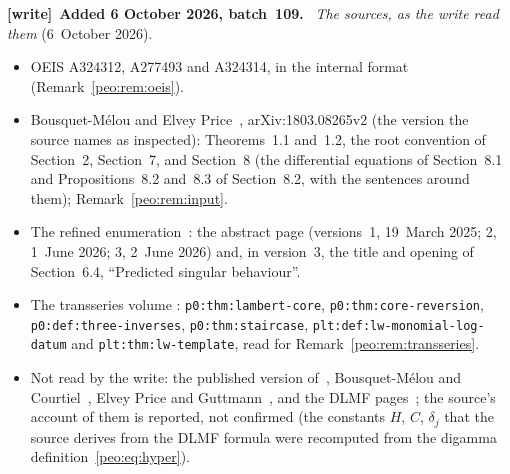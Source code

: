 \documentclass[11pt]{article}
\numberwithin{equation}{section}
\theoremstyle{remark}\newtheorem{remark}[theorem]{Remark}
\newcommand{\file}[1]{\nolinkurl{#1}}
\newenvironment{writenote}[1][]{\par\smallskip\begingroup\small
 \noindent\textbf{[write]}\if\relax\detokenize{#1}\relax\else~\textbf{#1.}\fi\ }%
 {\par\endgroup\smallskip}
\begin{document}
\begin{writenote}[Added 6 October 2026, batch~109]
\emph{The sources, as the write read them} (6~October 2026).
\begin{itemize}\raggedright
\item OEIS A324312, A277493 and A324314, in the internal format
 (Remark~\ref{peo:rem:oeis}).
\item Bousquet-M\'elou and Elvey Price~\cite{BMEP}, arXiv:1803.08265v2 (the
 version the source names as inspected): Theorems~1.1 and~1.2, the root
 convention of Section~2, Section~7, and Section~8 (the differential
 equations of Section~8.1 and Propositions~8.2 and~8.3 of Section~8.2, with
 the sentences around them); Remark~\ref{peo:rem:input}.
\item The refined enumeration~\cite{refined}: the abstract page (versions~1,
 19~March 2025; 2, 1~June 2026; 3, 2~June 2026) and, in version~3, the title
 and opening of Section~6.4, ``Predicted singular behaviour''.
\item The transseries volume
 :
 \file{p0:thm:lambert-core}, \file{p0:thm:core-reversion},
 \file{p0:def:three-inverses}, \file{p0:thm:staircase},
 \file{plt:def:lw-monomial-log-datum} and \file{plt:thm:lw-template}, read
 for Remark~\ref{peo:rem:transseries}.
\item Not read by the write: the published version of~\cite{BMEP},
 Bousquet-M\'elou and Courtiel~\cite{BC}, Elvey Price and
 Guttmann~\cite{EPG}, and the DLMF pages~\cite{DLMF}; the source's account of
 them is reported, not confirmed (the constants $H$, $C$, $\delta_j$ that the
 source derives from the DLMF formula were recomputed from the digamma
 definition~\eqref{peo:eq:hyper}).
\end{itemize}


\end{writenote}
\end{document}
